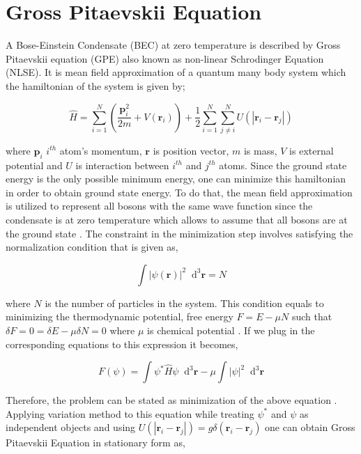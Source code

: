 \documentclass[a4paper,times,hidelinks,12pt]{article}
\newcommand*\dif{\mathop{}\!\mathrm{d}}
\begin{document}
\section{Gross Pitaevskii Equation}

A Bose-Einstein Condensate (BEC) at zero temperature is described by Gross Pitaevskii equation (GPE) also known as non-linear Schrodinger Equation (NLSE). It is mean field approximation of a quantum many body system which the hamiltonian of the system is given by;

\begin{equation}
\label{eq:GPE_hamiltonian}
\hat{H} = \sum_{i = 1}^{N} \left(\frac{\boldsymbol{p}_i^2}{2m} + V(\boldsymbol{r}_i) \right) + \frac{1}{2} \sum_{i = 1}^{N} \sum_{j \neq i}^{N} U(|\boldsymbol{r}_i - \boldsymbol{r}_j|)
\end{equation}

where $\textbf{p}_i$ $i^{th}$ atom's momentum, $\boldsymbol{r}$ is position vector, $m$ is mass, $V$ is external potential and $U$ is interaction between $i^{th}$ and $j^{th}$  atoms. Since the ground state energy is the only possible minimum energy, one can minimize this hamiltonian in order to obtain ground state energy. To do that, the mean field approximation is utilized to represent all bosons with the same wave function since the condensate is at zero temperature which allows to assume that all bosons are at the ground state \cite{pethick2002bose}. The constraint in the minimization step involves satisfying the normalization condition that is given as,


\begin{equation}
\label{eq:GPE_normalization}
\int |\psi(\boldsymbol{r})|^2 \dif^3 \boldsymbol{r} = N    
\end{equation}

where $N$ is the number of particles in the system. This condition equals to minimizing the thermodynamic potential, free energy $F = E - \mu N$ such that $\delta F = 0 = \delta E - \mu \delta N = 0$ where $\mu$ is chemical potential \cite{pethick2002bose}. If we plug in the corresponding equations to this expression it becomes,  

\begin{equation}
\label{eq:GPE_derivation_free_energy}
F(\psi) = \int \psi^{*}\hat{H}\psi \dif^3\boldsymbol{r} - \mu \int |\psi|^2 \dif^3\boldsymbol{r}
\end{equation}

Therefore, the problem can be stated as minimization of the above equation \cite{rogel2013gross}. Applying variation method to this equation while treating $\psi^{*}$
and $\psi$ as independent objects and using $U(|\textbf{r}_i - \textbf{r}_j|) = g\delta(\textbf{r}_i - \textbf{r}_j)$ one can obtain Gross Pitaevskii Equation in stationary form as, 
\end{document}
